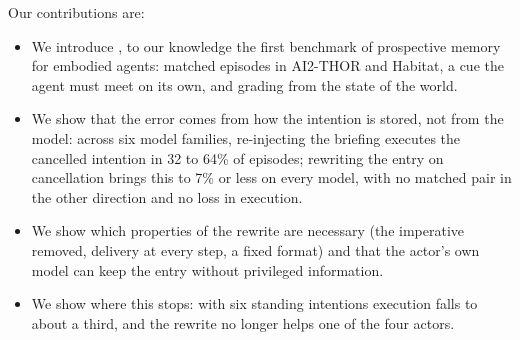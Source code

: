 Our contributions are:
\begin{itemize}
\item We introduce \bench{}, to our knowledge the first benchmark of
prospective memory for embodied agents: matched episodes in AI2-THOR and
Habitat, a cue the agent must meet on its own, and grading
from the state of the world.
\item We show that the error comes from how the intention is stored, not
from the model: across six model families, re-injecting the briefing
executes the cancelled intention in 32 to 64\% of episodes; rewriting the
entry on cancellation brings this to 7\% or less on every model, with no
matched pair in the other direction and no loss in execution.
\item We show which properties of the rewrite are necessary (the imperative
removed, delivery at every step, a fixed format) and that the actor's own
model can keep the entry without privileged information.
\item We show where this stops: with six standing intentions execution
falls to about a third, and the rewrite no longer helps one of the four
actors.
\end{itemize}

